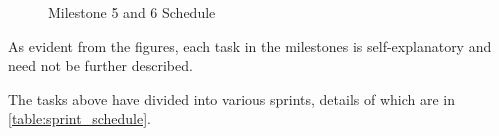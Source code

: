 \begin{figure}[H]
    \centering
    \caption{Milestone 5 and 6 Schedule}
    \label{fig:tl_ms5_ms6}
\end{figure}

As evident from the figures, each task in the milestones is self-explanatory and need not be further described.

The tasks above have divided into various sprints, details of which are in \autoref{table:sprint_schedule}.


